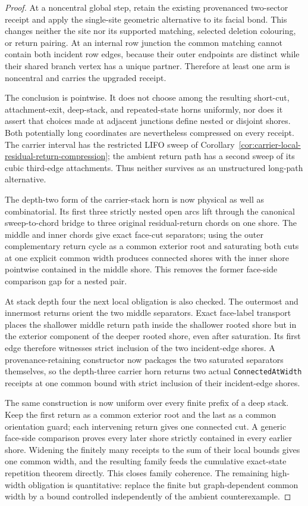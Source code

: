 \begin{proof}
At a noncentral global step, retain the existing provenanced two-sector
receipt and apply the single-site geometric alternative to its facial bond.
This changes neither the site nor its supported matching, selected deletion
colouring, or return pairing.  At an internal row junction the common matching
cannot contain both incident row edges, because their outer endpoints are
distinct while their shared branch vertex has a unique partner.  Therefore
at least one arm is noncentral and carries the upgraded receipt.

The conclusion is pointwise.  It does not choose among the resulting
short-cut, attachment-exit, deep-stack, and repeated-state horns uniformly,
nor does it assert that choices made at adjacent junctions define nested or
disjoint shores.  Both potentially long coordinates are nevertheless
compressed on every receipt.  The carrier interval has the restricted LIFO
sweep of Corollary~\ref{cor:carrier-local-residual-return-compression}; the
ambient return path has a second sweep of its cubic third-edge attachments.
Thus neither survives as an unstructured long-path alternative.

The depth-two form of the carrier-stack horn is now physical as well as
combinatorial.  Its first three strictly nested open arcs lift through the
canonical sweep-to-chord bridge to three original residual-return chords on
one shore.  The middle and inner chords give exact face-cut separators; using
the outer complementary return cycle as a common exterior root and saturating
both cuts at one explicit common width produces connected shores with the
inner shore pointwise contained in the middle shore.  This removes the former
face-side comparison gap for a nested pair.

At stack depth four the next local obligation is also checked.  The outermost and
innermost returns orient the two middle separators.  Exact face-label
transport places the shallower middle return path inside the shallower rooted
shore but in the exterior component of the deeper rooted shore, even after
saturation.  Its first edge therefore witnesses strict inclusion of the two
incident-edge shores.  A provenance-retaining constructor now packages the
two saturated separators themselves, so the depth-three carrier horn returns
two actual \texttt{ConnectedAtWidth} receipts at one common bound with strict
inclusion of their incident-edge shores.

The same construction is now uniform over every finite prefix of a deep
stack.  Keep the first return as a common exterior root and the last as a
common orientation guard; each intervening return gives one connected cut.
A generic face-side comparison proves every later shore strictly contained
in every earlier shore.  Widening the finitely many receipts to the sum of
their local bounds gives one common width, and the resulting family feeds the
cumulative exact-state repetition theorem directly.  This closes family
coherence.  The remaining high-width obligation is quantitative: replace the
finite but graph-dependent common width by a bound controlled independently
of the ambient counterexample.


\end{proof}

